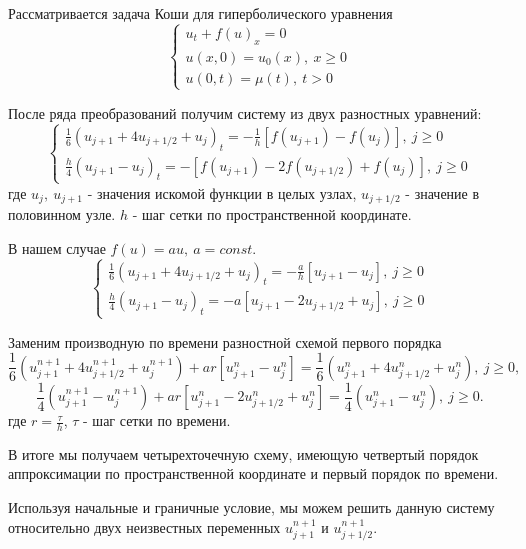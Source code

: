 \documentclass{article}
\begin{document}
Рассматривается задача Коши для гиперболического уравнения
$$  \left\{
        \begin{array}{l}
            u_t + f(u)_x = 0 \\
            u(x,0) = u_0(x), \: x\geq0 \\
            u(0,t) = \mu(t), \: t>0
        \end{array}
    \right. $$

После ряда преобразований получим систему из двух разностных уравнений:
$$  \left\{
        \begin{array}{l}
            \frac{1}{6}(u_{j+1}+4u_{j+1/2}+u_j)_t = -\frac{1}{h}[f(u_{j+1})-f(u_j)], \: j \geq 0 \\
            \frac{h}{4}(u_{j+1}-u_j)_t = -[f(u_{j+1})-2f(u_{j+1/2})+f(u_j)], \: j \geq 0
        \end{array}
    \right. $$
где $u_j, \: u_{j+1}$ - значения искомой функции в целых узлах, $u_{j+1/2}$ - значение в половинном узле. $h$ - шаг сетки по пространственной координате.

В нашем случае $f(u)=au,\:a=const$.
$$  \left\{
        \begin{array}{l}
            \frac{1}{6}(u_{j+1}+4u_{j+1/2}+u_j)_t = -\frac{a}{h}[u_{j+1}-u_j], \: j \geq 0 \\
            \frac{h}{4}(u_{j+1}-u_j)_t = -a[u_{j+1}-2u_{j+1/2}+u_j], \: j \geq 0
        \end{array}
    \right. $$

Заменим производную по времени разностной схемой первого порядка
$$\frac{1}{6}(u^{n+1}_{j+1}+4u^{n+1}_{j+1/2}+u^{n+1}_j)+ar[u^n_{j+1}-u^n_j] = \frac{1}{6}(u^n_{j+1}+4u^n_{j+1/2}+u^n_j), \: j\geq0, $$
$$\frac{1}{4}(u^{n+1}_{j+1}-u^{n+1}_j) + ar[u^n_{j+1}-2u^n_{j+1/2}+u^n_j] = \frac{1}{4}(u^n_{j+1}-u^n_j), \: j\geq0.$$
где $r=\frac{\tau}{h}$, $\tau$ - шаг сетки по времени.

В итоге мы получаем четырехточечную схему, имеющую четвертый порядок аппроксимации по пространственной координате и первый порядок по времени.

Используя начальные и граничные условие, мы можем решить данную систему относительно двух неизвестных переменных $u^{n+1}_{j+1}$ и $u^{n+1}_{j+1/2}$.
\end{document}
